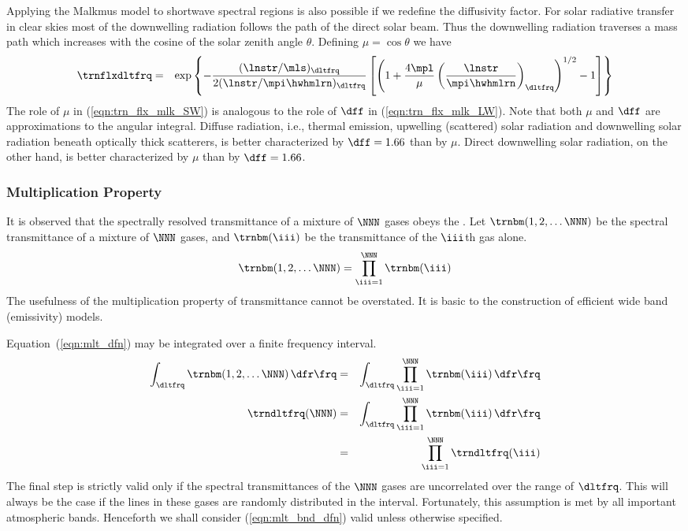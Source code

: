 \documentclass[12pt]{article}
\begin{document}
Applying the Malkmus model to shortwave spectral regions is also
possible if we redefine the diffusivity factor. 
For solar radiative transfer in clear skies most of the downwelling
radiation follows the path of the direct solar beam.
Thus the downwelling radiation traverses a mass path which increases
with the cosine of the solar zenith angle $\theta$. 
Defining $\mu = \cos \theta$ we have
\begin{eqnarray}
\trnflxdltfrq & = & \exp \left\{ - \frac{ ( \lnstr / \mls )_{\dltfrq}}{2 ( \lnstr
/ \mpi \hwhmlrn )_{\dltfrq} } \left[ \left( 1 + \frac{4 \mpl}{\mu} \left( \frac{\lnstr
}{\mpi \hwhmlrn} \right)_{\dltfrq} \right)^{1/2} - 1 \right] \right\} 
\label{eqn:trn_flx_mlk_SW}
\end{eqnarray}
The role of $\mu$ in (\ref{eqn:trn_flx_mlk_SW}) is analogous to the
role of $\dff$ in (\ref{eqn:trn_flx_mlk_LW}).
Note that both $\mu$ and $\dff$ are approximations to the angular
integral. 
Diffuse radiation, i.e., thermal emission, upwelling (scattered) solar
radiation and downwelling solar radiation beneath optically thick
scatterers, is better characterized by $\dff = 1.66$ than by $\mu$.
Direct downwelling solar radiation, on the other hand, is better
characterized by $\mu$ than by $\dff = 1.66$.

\subsubsection[Multiplication Property]{Multiplication Property}\label{sxn:mlt}
It is observed that the spectrally resolved transmittance of a mixture
of $\NNN$ gases obeys the .
Let $\trnbm(1, 2, \ldots \NNN)$ be the spectral transmittance of a
mixture of $\NNN$ gases, and $\trnbm(\iii)$ be the transmittance of
the $\iii$th gas alone. 
\begin{equation}
\trnbm(1, 2, \ldots \NNN) = \prod_{\iii = 1}^{\NNN} \trnbm(\iii)
\label{eqn:mlt_dfn}
\end{equation}
The usefulness of the multiplication property of transmittance cannot 
be overstated.
It is basic to the construction of efficient wide band (emissivity)
models. 

Equation~(\ref{eqn:mlt_dfn}) may be integrated over a finite frequency
interval.
\begin{eqnarray}
\int_{\dltfrq} \trnbm(1, 2, \ldots \NNN) \,\dfr\frq & = & 
\int_{\dltfrq} \prod_{\iii = 1}^{\NNN} \trnbm(\iii) \,\dfr\frq
\nonumber \\
\trndltfrq(\NNN) & = & 
\int_{\dltfrq} \prod_{\iii = 1}^{\NNN} \trnbm(\iii) \,\dfr\frq
\nonumber \\
& = & \prod_{\iii = 1}^{\NNN} \trndltfrq(\iii) 
\label{eqn:mlt_bnd_dfn}
\end{eqnarray}
The final step is strictly valid only if the spectral transmittances of
the $\NNN$ gases are uncorrelated over the range of $\dltfrq$.
This will always be the case if the lines in these gases are randomly
distributed in the interval.
Fortunately, this  assumption is met by all
important atmospheric bands.
Henceforth we shall consider (\ref{eqn:mlt_bnd_dfn}) valid unless
otherwise specified.
\end{document}
